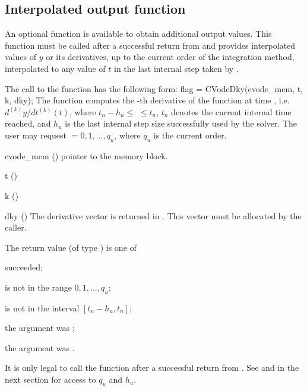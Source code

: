 
\subsection{Interpolated output function}\label{ss:optional_dky}

An optional function  is available to obtain additional output values.  
This function must be called after a successful return from  and provides 
interpolated values of $y$ or its derivatives, up to the current order of the 
integration method, interpolated to any value of $t$ in the last internal step 
taken by {\cvodes}.

The call to the  function has the following form:
{
  flag = CVodeDky(cvode\_mem, t, k, dky);
}
{
  The function  computes the -th derivative of the  function at      
  time , i.e. $d^{(k)}y/dt^{(k)} (t)$, where $t_n - h_u \le$  $\le t_n$, 
  $t_n$ denotes the current internal time reached, and $h_u$ is the 
  last internal step size successfully used by the solver. 
  The user may request  $= 0, 1, ..., q_u$, where $q_u$ is the 
  current order. 
}
{
  \begin{args}
  \item[cvode\_mem] ()
    pointer to the {\cvodes} memory block.
  \item[t] ()
  \item[k] ()
  \item[dky] ()
    The derivative vector is returned in . 
    This vector must be allocated by the caller. 
  \end{args}
}
{
  The return value  (of type ) is one of
  \begin{args} 
  \item[\Id{OKAY}]
     succeeded;
  \item[\Id{BAD\_K}] 
     is not in the range $0, 1, ..., q_u$;
  \item[\Id{BAD\_T}] 
     is not in the interval $[t_n - h_u , t_n]$;
  \item[\Id{BAD\_DKY}] 
    the  argument was ;
  \item[\Id{DKY\_NO\_MEM}] 
    the  argument was .
  \end{args}

}
{
  It is only legal to call the function  after a 
  successful return from . See  
  and  in the next section for access to 
  $q_u$ and $h_u$.
}

